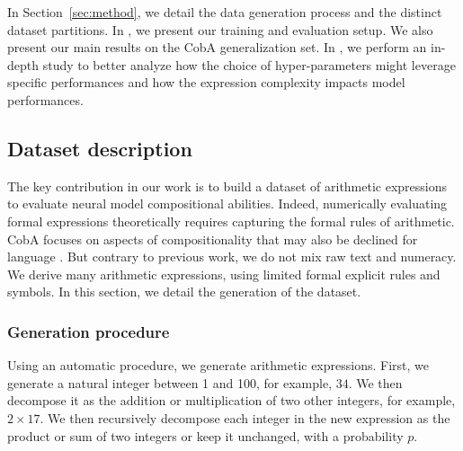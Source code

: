 
In Section~\ref{sec:method}, we detail the data generation process and the distinct dataset partitions. In , we present our training and evaluation setup. We also present our main results on the CobA generalization set. In , we perform an in-depth study to better analyze how the choice of hyper-parameters might leverage specific performances and how the expression complexity impacts model performances.



\subsection{Dataset description}

The key contribution in our work is to build a dataset of arithmetic expressions to evaluate neural model compositional abilities. Indeed, numerically evaluating formal expressions theoretically requires capturing the formal rules of arithmetic. CobA focuses on aspects of compositionality that may also be declined for language \parencite{hupkes_20}. But contrary to previous work, we do not mix raw text and numeracy. We derive many arithmetic expressions, using limited formal explicit rules and symbols. In this section, we detail the generation of the dataset.


\subsubsection{Generation procedure}

Using an automatic procedure, we generate arithmetic expressions. First, we generate a natural integer between 1 and 100, for example, $34$. We then decompose it as the addition or multiplication of two other integers, for example, $2 \times 17$. We then recursively decompose each integer in the new expression as the product or sum of two integers or keep it unchanged, with a probability $p$.

